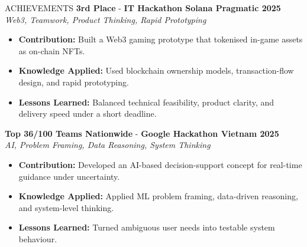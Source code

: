 \documentclass{resume}
\begin{document}
\newpage

\begin{rSection}{ACHIEVEMENTS}
    \vspace{-2pt}
    \itemsep -3pt {}
    \textbf{3rd Place} - \textbf{IT Hackathon Solana Pragmatic 2025}\\
    {\small \textit{Web3, Teamwork, Product Thinking, Rapid Prototyping}}
    \begin{itemize}
        \itemsep -4pt {}
        \item \textbf{Contribution:} Built a Web3 gaming prototype that tokenised in-game assets as on-chain NFTs.
        \item \textbf{Knowledge Applied:} Used blockchain ownership models, transaction-flow design, and rapid prototyping.
        \item \textbf{Lessons Learned:} Balanced technical feasibility, product clarity, and delivery speed under a short deadline.
    \end{itemize}
    \textbf{Top 36/100 Teams Nationwide} - \textbf{Google Hackathon Vietnam 2025}\\
    {\small \textit{AI, Problem Framing, Data Reasoning, System Thinking}}
    \begin{itemize}
        \itemsep -4pt {}
        \item \textbf{Contribution:} Developed an AI-based decision-support concept for real-time guidance under uncertainty.
        \item \textbf{Knowledge Applied:} Applied ML problem framing, data-driven reasoning, and system-level thinking.
        \item \textbf{Lessons Learned:} Turned ambiguous user needs into testable system behaviour.
    \end{itemize}
\end{rSection}
\end{document}
